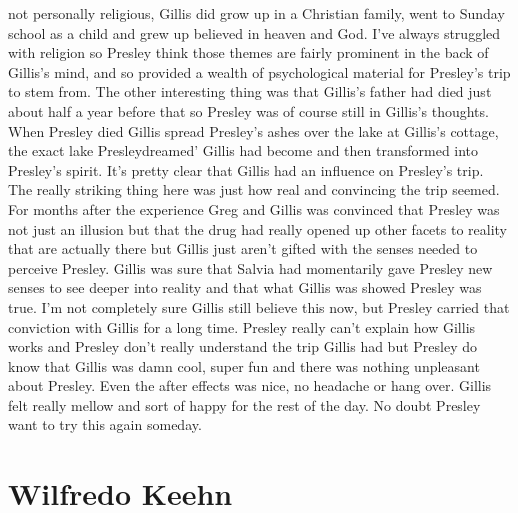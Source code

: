 \documentclass[12pt]{book}
\begin{document}
not personally religious, Gillis did grow up in a Christian family, went to Sunday school as a child and grew up believed in heaven and God. I've always struggled with religion so Presley think those themes are fairly prominent in the back of Gillis's mind, and so provided a wealth of psychological material for Presley's trip to stem from. The other interesting thing was that Gillis's father had died just about half a year before that so Presley was of course still in Gillis's thoughts. When Presley died Gillis spread Presley's ashes over the lake at Gillis's cottage, the exact lake Presleydreamed' Gillis had become and then transformed into Presley's spirit. It's pretty clear that Gillis had an influence on Presley's trip. The really striking thing here was just how real and convincing the trip seemed. For months after the experience Greg and Gillis was convinced that Presley was not just an illusion but that the drug had really opened up other facets to reality that are actually there but Gillis just aren't gifted with the senses needed to perceive Presley. Gillis was sure that Salvia had momentarily gave Presley new senses to see deeper into reality and that what Gillis was showed Presley was true. I'm not completely sure Gillis still believe this now, but Presley carried that conviction with Gillis for a long time. Presley really can't explain how Gillis works and Presley don't really understand the trip Gillis had but Presley do know that Gillis was damn cool, super fun and there was nothing unpleasant about Presley. Even the after effects was nice, no headache or hang over. Gillis felt really mellow and sort of happy for the rest of the day. No doubt Presley want to try this again someday.






\chapter{Wilfredo Keehn}
\end{document}
